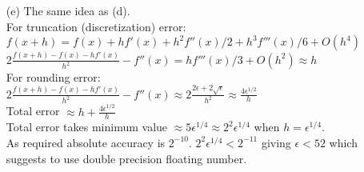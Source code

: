 \documentclass[10pt,twoside,a4paper]{article}
\begin{document}
\begin{itemize}
\item[(e)]
The same idea as (d).
\\For truncation (discretization) error:
\\$f(x+h)=f(x)+hf'(x)+h^2f''(x)/2+h^3f'''(x)/6+O(h^4)$
\\$2\frac{f(x+h)-f(x)-hf'(x)}{h^2} -f''(x)=hf'''(x)/3+O(h^2)\approx h$
\\For rounding error:
\\$2\frac{f(x+h)-f(x)-hf'(x)}{h^2} -f''(x)\approx 2\frac{2\epsilon+2\sqrt{\epsilon}}{h^2}\approx\frac{4\epsilon^{1/2}}{h}$
\\Total error $\approx h+\frac{4\epsilon^{1/2}}{h}$
\\Total error takes minimum value $\approx 5 \epsilon^{1/4} \approx 2^2\epsilon^{1/4}$ when $h=\epsilon^{1/4}$.
\\As required absolute accuracy is $2^{-10}$. $2^2\epsilon^{1/4}<2^{-11}$ giving $\epsilon<52$ which suggests to use double precision floating number.

\end{itemize}
\end{document}

